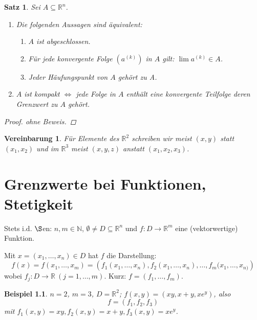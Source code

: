 \documentclass[12pt]{extreport} %
\newcommand{\N}{\mathbb{N}}
\newcommand{\R}{\mathbb{R}}
\theoremstyle{named}
\theoremstyle{nnamed}
\theoremstyle{itshape}
\newtheorem{satz}[unnamedtheorem]{Satz}
\theoremstyle{normal}
\newtheorem*{beispiel*}{Beispiel}
\newtheorem*{vereinbarung}{Vereinbarung}
\begin{document}
\begin{satz} \label{15.2:satz}
	Sei $A \subseteq \R^{n}$.
	\begin{enumerate}
		\item Die folgenden Aussagen sind äquivalent:
			\begin{enumerate}
				\item $A$ ist abgeschlossen.
				\item Für jede konvergente Folge $\left( a^{(k)} \right)$ in $A$ gilt: $\lim a^{(k)} \in A$.
				\item Jeder Häufungspunkt von $A$ gehört zu A.
			\end{enumerate}
		\item $A$ ist kompakt $\iff$ jede Folge in $A$ enthält eine konvergente Teilfolge deren Grenzwert zu $A$ gehört.
	\end{enumerate}

	\begin{proof}
		ohne Beweis.
	\end{proof}
\end{satz}


\begin{vereinbarung}
	Für Elemente des $\R^{2}$ schreiben wir meist $(x, y)$ statt $(x_{1}, x_{2})$ und im $\R^{3}$ meist $(x, y, z)$ anstatt $(x_{1}, x_{2}, x_{3})$.	
\end{vereinbarung}


\chapter{Grenzwerte bei Funktionen, Stetigkeit}


Stets i.d. $\S$en: $n, m \in \N$, $\emptyset \neq D \subseteq \R^{n}$ und $f \colon D \rightarrow \R^{m}$ eine (vektorwertige) Funktion. 

Mit $x = (x_{1}, \dotsc, x_{n}) \in D$ hat $f$  die Darstellung:
	$$ f(x) = f(x_{1}, \dotsc, x_{m}) = \left( f_{1}(x_{1}, \dotsc, x_{n}), f_{2}(x_{1}, \dotsc, x_{n}), \dotsc, f_{m}(x_{1}, \dotsc, x_{n)} \right) $$
wobei $f_{j} \colon D \rightarrow \R ~ (j = 1, \dotsc, m)$. Kurz: $f = (f_{1}, \dotsc, f_{m})$.


\begin{beispiel*}
	$n = 2$, $m = 3$, $D = \R^{2}$; $f(x, y) = (xy, x + y, xe^{y})$, also
	$$ f = (f_{1}, f_{2}, f_{3}) $$
	mit $f_{1}(x, y) = xy, f_{2}(x, y) = x + y,  f_{3}(x, y) = x e^{y}$.
\end{beispiel*}
\end{document}
